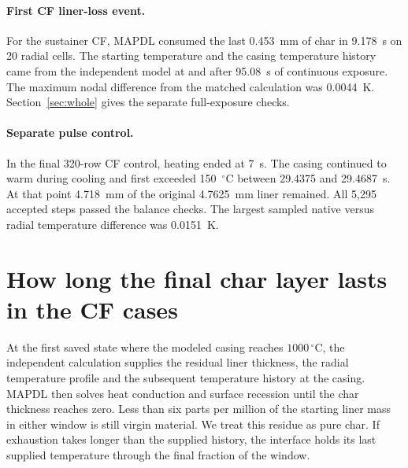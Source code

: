 \paragraph{First CF liner-loss event.} For the sustainer CF, MAPDL consumed the last
0.453~mm of char in 9.178~s on 20 radial cells. The starting temperature and
the casing temperature history came from the independent model at and after
95.08~s of continuous exposure. The maximum nodal difference from the matched
calculation was 0.0044~K. Section~\ref{sec:whole} gives the separate full-exposure checks.

\paragraph{Separate pulse control.} In the final 320-row CF control, heating
ended at 7~s. The casing continued to warm during cooling and first exceeded
150~$^\circ$C between 29.4375 and 29.4687~s. At that point 4.718~mm of the original
4.7625~mm liner remained. All 5,295 accepted steps passed the balance checks.
The largest sampled native versus radial temperature difference was 0.0151~K.

\clearpage
\section{How long the final char layer lasts in the CF cases}\label{sec:nativecfend}
At the first saved state where the modeled casing reaches $1000\,^\circ$C,
the independent calculation supplies the residual liner thickness, the radial
temperature profile and the subsequent temperature history at the casing.
MAPDL then solves heat conduction and surface recession until the char thickness
reaches zero. Less than six parts per million of the starting liner mass in
either window is still virgin material. We treat this residue as pure char.
If exhaustion takes longer than the supplied history, the interface holds its
last supplied temperature through the final fraction of the window.

